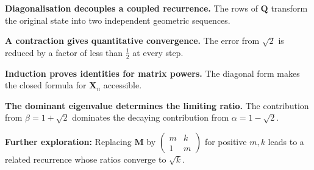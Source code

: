 \begin{takeaways}
\item \textbf{Diagonalisation decouples a coupled recurrence.} The rows of $\mathbf{Q}$ transform the original state into two independent geometric sequences.
\item \textbf{A contraction gives quantitative convergence.} The error from $\sqrt{2}$ is reduced by a factor of less than $\frac12$ at every step.
\item \textbf{Induction proves identities for matrix powers.} The diagonal form makes the closed formula for $\mathbf{X}_n$ accessible.
\item \textbf{The dominant eigenvalue determines the limiting ratio.} The contribution from $\beta=1+\sqrt{2}$ dominates the decaying contribution from $\alpha=1-\sqrt{2}$.
\item \textbf{Further exploration:} Replacing $\mathbf{M}$ by $\begin{pmatrix}m&k\\1&m\end{pmatrix}$ for positive $m,k$ leads to a related recurrence whose ratios converge to $\sqrt{k}$.
\end{takeaways}
